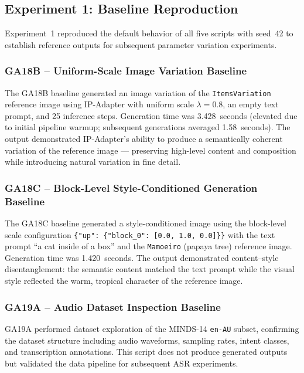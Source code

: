 \documentclass[conference]{IEEEtran}
\newcommand{\ipadapter}{IP-Adapter}
\begin{document}
\subsection{Experiment 1: Baseline Reproduction}
\label{sec:exp1}

Experiment~1 reproduced the default behavior of all five scripts with seed~42 to establish reference outputs for subsequent parameter variation experiments.

\subsubsection{GA18B -- Uniform-Scale Image Variation Baseline}
The GA18B baseline generated an image variation of the \texttt{ItemsVariation} reference image using \ipadapter{} with uniform scale \(\lambda = 0.8\), an empty text prompt, and 25 inference steps. Generation time was 3.428~seconds (elevated due to initial pipeline warmup; subsequent generations averaged 1.58~seconds). The output demonstrated \ipadapter{}'s ability to produce a semantically coherent variation of the reference image --- preserving high-level content and composition while introducing natural variation in fine detail.

\subsubsection{GA18C -- Block-Level Style-Conditioned Generation Baseline}
The GA18C baseline generated a style-conditioned image using the block-level scale configuration \texttt{\{"up": \{"block\_0": [0.0, 1.0, 0.0]\}\}} with the text prompt ``a cat inside of a box'' and the \texttt{Mamoeiro} (papaya tree) reference image. Generation time was 1.420~seconds. The output demonstrated content--style disentanglement: the semantic content matched the text prompt while the visual style reflected the warm, tropical character of the reference image.

\subsubsection{GA19A -- Audio Dataset Inspection Baseline}
GA19A performed dataset exploration of the MINDS-14 \texttt{en-AU} subset, confirming the dataset structure including audio waveforms, sampling rates, intent classes, and transcription annotations. This script does not produce generated outputs but validated the data pipeline for subsequent ASR experiments.
\end{document}
